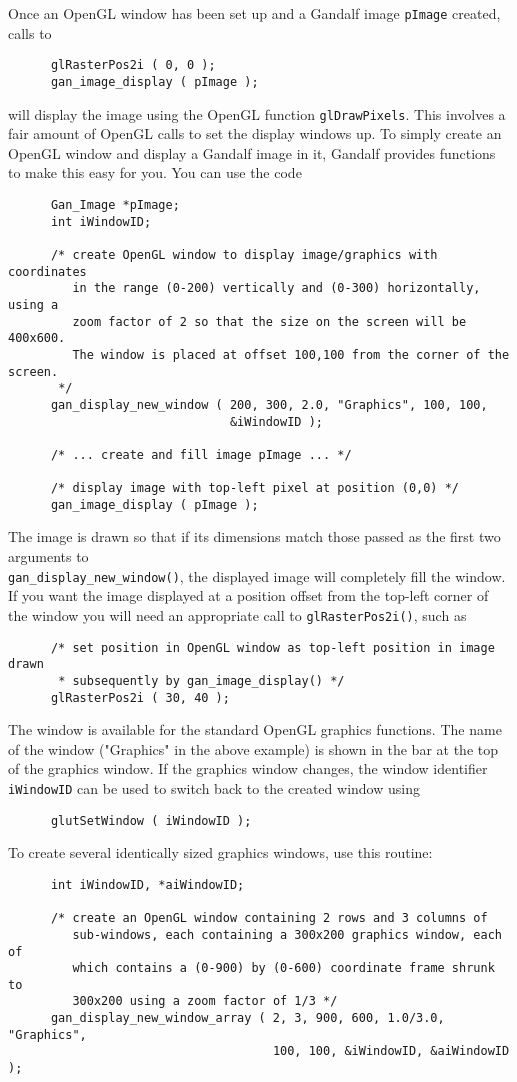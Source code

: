 Once an OpenGL window has been set up and a Gandalf image {\tt pImage}
created, calls to
\begin{verbatim}
      glRasterPos2i ( 0, 0 );
      gan_image_display ( pImage );
\end{verbatim}
will display the image using the OpenGL function {\tt glDrawPixels}.
This involves a fair amount of OpenGL calls to set the display windows up.
To simply create an OpenGL window and display a Gandalf image in it,
Gandalf provides functions to make this easy for you. You can use the code
\begin{verbatim}
      Gan_Image *pImage;
      int iWindowID;

      /* create OpenGL window to display image/graphics with coordinates
         in the range (0-200) vertically and (0-300) horizontally, using a
         zoom factor of 2 so that the size on the screen will be 400x600.
         The window is placed at offset 100,100 from the corner of the screen.
       */
      gan_display_new_window ( 200, 300, 2.0, "Graphics", 100, 100,
                               &iWindowID );

      /* ... create and fill image pImage ... */

      /* display image with top-left pixel at position (0,0) */
      gan_image_display ( pImage );
\end{verbatim}
The image is drawn so that if its dimensions match those passed as the first
two arguments to\\ {\tt gan\_display\_new\_window()}, the displayed image will
completely fill the window. If you want the image displayed at a position
offset from the top-left corner of the window you will need
an appropriate call to {\tt glRasterPos2i()}, such as
\begin{verbatim}
      /* set position in OpenGL window as top-left position in image drawn
       * subsequently by gan_image_display() */
      glRasterPos2i ( 30, 40 );
\end{verbatim}
The window is available for the standard
OpenGL graphics functions. The name of the window ("Graphics" in the above
example) is shown in the bar at the top of the graphics window.
If the graphics window changes, the window
identifier {\tt iWindowID} can be used to switch back to the created
window using
\begin{verbatim}
      glutSetWindow ( iWindowID );
\end{verbatim}
To create several identically sized graphics windows, use this routine:
\begin{verbatim}
      int iWindowID, *aiWindowID;

      /* create an OpenGL window containing 2 rows and 3 columns of
         sub-windows, each containing a 300x200 graphics window, each of
         which contains a (0-900) by (0-600) coordinate frame shrunk to
         300x200 using a zoom factor of 1/3 */
      gan_display_new_window_array ( 2, 3, 900, 600, 1.0/3.0, "Graphics",
                                     100, 100, &iWindowID, &aiWindowID );
\end{verbatim}
